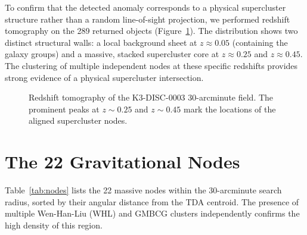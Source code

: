 \documentclass[aps,prd,twocolumn,nofootinbib,superscriptaddress,10pt]{revtex4-2}
\begin{document}
To confirm that the detected anomaly corresponds to a physical supercluster structure rather than a random line-of-sight projection, we performed redshift tomography on the 289 returned objects (Figure~\ref{fig:redshift}). The distribution shows two distinct structural walls: a local background sheet at $z \approx 0.05$ (containing the galaxy groups) and a massive, stacked supercluster core at $z \approx 0.25$ and $z \approx 0.45$. The clustering of multiple independent nodes at these specific redshifts provides strong evidence of a physical supercluster intersection.

\begin{figure}[t]
\centering
{}
\caption{Redshift tomography of the K3-DISC-0003 30-arcminute field. The prominent peaks at $z \sim 0.25$ and $z \sim 0.45$ mark the locations of the aligned supercluster nodes.}
\label{fig:redshift}
\end{figure}

\section{The 22 Gravitational Nodes}

Table~\ref{tab:nodes} lists the 22 massive nodes within the 30-arcminute search radius, sorted by their angular distance from the TDA centroid. The presence of multiple Wen-Han-Liu (WHL) and GMBCG clusters independently confirms the high density of this region.
\end{document}
